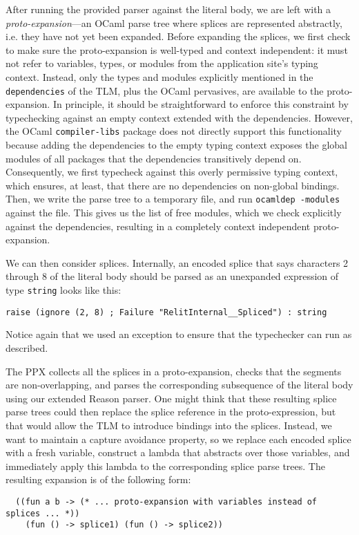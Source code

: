\documentclass[acmsmall]{acmart}
\newcommand{\li}[1]{\lstinline[basicstyle=\ttfamily\fontsize{9pt}{1em}\selectfont]{#1}}
\theoremstyle{slplain}
\numberwithin{thm}{section}
\begin{document}
After running the provided parser against the literal body, we are left with a \emph{proto-expansion}---an OCaml parse tree where splices are represented abstractly, i.e. they have not yet been expanded. Before expanding the splices, we first check to make sure the proto-expansion is well-typed and context independent: it must not refer to variables, types, or modules from the application site's typing context. Instead, only the types and modules explicitly mentioned in the \li{dependencies} of the TLM, plus the OCaml pervasives, are available to the proto-expansion. In principle, it should be straightforward to enforce this constraint by typechecking against an empty context extended with the dependencies. However, the OCaml \li{compiler-libs} package does not directly support this functionality because adding the dependencies to the empty typing context exposes the global modules of all packages that the dependencies transitively depend on. 
Consequently, we first typecheck against this overly permissive typing context, which ensures, at least, that there are no dependencies on non-global bindings. Then, we write the parse tree to a temporary file, and run \li{ocamldep -modules} against the file. This gives us the list of free modules, which we check explicitly against the dependencies, resulting in a completely context independent proto-expansion.

We can then consider splices. Internally, an encoded splice that says characters 2 through 8 of the literal body should be parsed as an unexpanded expression of type \li{string} looks like this:
\begin{lstlisting}[numbers=none]
  raise (ignore (2, 8) ; Failure "RelitInternal__Spliced") : string
\end{lstlisting}
Notice again that we used an exception to ensure that the typechecker can run as described. 

The PPX collects all the splices in a proto-expansion, checks that the segments are non-overlapping, and parses the corresponding subsequence of the literal body using our extended Reason parser. One might think that these resulting splice parse trees could then replace the splice reference in the proto-expression, but that would allow the TLM to introduce bindings into the splices. Instead, we want to maintain a capture avoidance property, so we replace each encoded splice with a fresh variable, construct a lambda that abstracts over those variables, and immediately apply this lambda to the corresponding splice parse trees. The resulting expansion is of the following form:
\begin{lstlisting}
  ((fun a b -> (* ... proto-expansion with variables instead of splices ... *)) 
    (fun () -> splice1) (fun () -> splice2))
\end{lstlisting}
\end{document}
